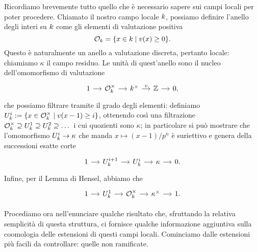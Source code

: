 Ricordiamo brevemente tutto quello che è necessario sapere sui campi locali per poter procedere. Chiamato il nostro campo locale $ k $, possiamo definire l'anello degli interi su $ k $ come gli elementi di valutazione positiva
\[ \mathcal{O}_{k} = \{ x \in k \mid v(x)\geq 0 \}. \]
Questo è naturalmente un anello a valutazione discreta, pertanto locale: chiamiamo $ \kappa $ il campo residuo. Le unità di quest'anello sono il nucleo dell'omomorfismo di valutazione
\begin{equation}\label{local1}
	\begin{tikzcd}[column sep = small]
	1 \rar
	& \mathcal{O}_{\K}^\times \rar
	& \K^\times \rar["v"]
	& \Z \rar
	& 0,
	\end{tikzcd}
\end{equation}
che possiamo filtrare tramite il grado degli elementi: definiamo $ U_{k}^i :=\{x \in \mathcal{O}_{k}^\times \mid v(x-1) \geq i \} $, ottenendo così una filtrazione $ \mathcal{O}_{k}^\times \supseteq U_{k}^1 \supseteq U_{k}^2 \supseteq \dots $ 
i cui quozienti sono $ \kappa $; in particolare si può mostrare che l'omomorfismo $ U_{k}^i \to \kappa $ che manda $ x \mapsto (x-1)/p^n $ è suriettivo e genera della successioni esatte corte
\begin{equation}\label{local2}
\begin{tikzcd}[column sep = small]
1 \rar
& U_k^{i+1} \rar
& U_{\K}^i \rar
& \kappa \rar
& 0.
\end{tikzcd}
\end{equation}
Infine, per il Lemma di Hensel, abbiamo che
\begin{equation}\label{local3}
	\begin{tikzcd}[column sep = small]
	1 \rar
	& U_k^{1} \rar
	& \mathcal{O}_{\K}^\times \rar
	& \kappa^\times \rar
	&1.
	\end{tikzcd}
\end{equation}


Procediamo ora nell'enunciare qualche risultato che, sfruttando la relativa semplicità di questa struttura, ci fornisce qualche informazione aggiuntiva sulla coomologia delle estensioni di questi campi locali. Cominciamo dalle estensioni più facili da controllare: quelle non ramificate.

